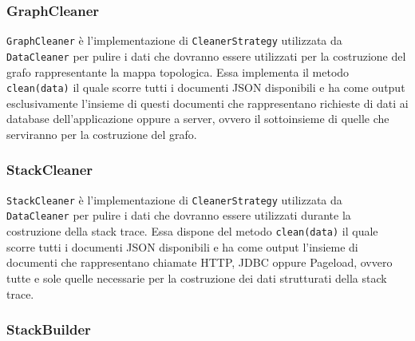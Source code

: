 	
	
\subsubsection{GraphCleaner}
\label{sec:GraphCleaner}

\texttt{GraphCleaner} è l'implementazione di \texttt{CleanerStrategy} utilizzata da \texttt{DataCleaner} per pulire i dati che dovranno essere utilizzati per la costruzione del grafo rappresentante la mappa topologica. Essa implementa il metodo \texttt{clean(data)} il quale scorre tutti i documenti JSON disponibili e ha come output esclusivamente l'insieme di questi documenti che rappresentano richieste di dati ai database dell'applicazione oppure a server, ovvero il sottoinsieme di quelle che serviranno per la costruzione del grafo.
	
\subsubsection{StackCleaner}
\label{sec:StackCleaner}

\texttt{StackCleaner} è l'implementazione di \texttt{CleanerStrategy} utilizzata da \texttt{DataCleaner} per pulire i dati che dovranno essere utilizzati durante la costruzione della stack trace. Essa dispone del metodo \texttt{clean(data)} il quale scorre tutti i documenti JSON disponibili e ha come output l'insieme di documenti che rappresentano chiamate HTTP, JDBC oppure Pageload, ovvero tutte e sole quelle necessarie per la costruzione dei dati strutturati della stack trace.
	

\subsubsection{StackBuilder}
\label{sec:StackBuilder}

